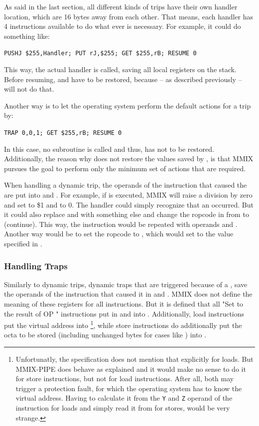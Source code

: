 As said in the last section, all different kinds of trips have their own handler location, which are 16 bytes away from each other. That means, each handler has 4 instructions available to do what ever is necessary. For example, it could do something like:
\begin{center}
	\lstinline`PUSHJ $255,Handler; PUT rJ,$255; GET $255,rB; RESUME 0`
\end{center}
This way, the actual handler is called, saving all local registers on the stack. Before resuming,  and  have to be restored, because -- as described previously --  will not do that. \citep[pg. 28]{mmix-doc}

Another way is to let the operating system perform the default actions for a trip by:
\begin{center}
	\lstinline`TRAP 0,0,1; GET $255,rB; RESUME 0`
\end{center}
In this case, no subroutine is called and thus,  has not to be restored. \citep[pg. 28]{mmix-doc} Additionally, the reason why  does not restore the values saved by , is that MMIX pursues the goal to perform only the minimum set of actions that are required.

When handling a dynamic trip, the operands of the instruction that caused the  are put into  and . For example, if  is executed, MMIX will raise a division by zero  and set  to \$1 and  to 0. The handler could simply recognize that an  occurred. But it could also replace  and  with something else and change the ropcode in  from  to  (continue). This way, the instruction would be repeated with operands  and . Another way would be to set the ropcode to , which would set  to the value specified in . \citep[pg. 28]{mmix-doc}

\subsubsection{Handling Traps}

Similarly to dynamic trips, dynamic traps that are triggered because of a , save the operands of the instruction that caused it in  and . MMIX does not define the meaning of these registers for all instructions. But it is defined that all "Set  to the result of  OP " instructions put  in  and  into . Additionally, load instructions put the virtual address into \footnote{Unfortunatly, the specification does not mention that explicitly for loads. But MMIX-PIPE does behave as explained and it would make no sense to do it for store instructions, but not for load instructions. After all, both may trigger a protection fault, for which the operating system has to know the virtual address. Having to calculate it from the {\tt Y} and {\tt Z} operand of the instruction for loads and simply read it from  for stores, would be very strange.}, while store instructions do additionally put the octa to be stored (including unchanged bytes for cases like ) into . \citep[pg. 27]{mmix-doc}

